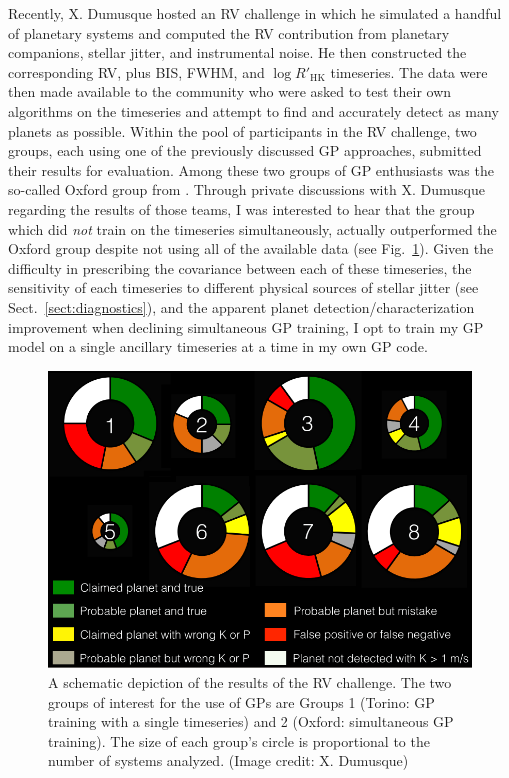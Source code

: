 Recently, X. Dumusque hosted an RV challenge \parencite[part I in][]{dumusque16} 
in which he simulated a handful of planetary systems and 
computed the RV contribution from planetary companions, stellar jitter, and instrumental 
noise. He then constructed the corresponding 
RV, plus BIS, FWHM, and $\log{R'_{\mathrm{HK}}}$ timeseries. The data were then made 
available to the community who were asked 
to test their own algorithms on the timeseries and attempt to find and accurately 
detect as many planets as possible. 
Within the pool of participants in the RV challenge, two groups, each using one of the 
previously discussed GP approaches, submitted their results for evaluation. Among these 
two groups of GP enthusiasts was the so-called Oxford group from \cite{rajpaul15}. 
Through 
private discussions with X. Dumusque regarding the results of those teams, I was 
interested 
to hear that the group which did \emph{not} train on the timeseries 
simultaneously, actually outperformed the Oxford group despite not using all of the 
available data (see Fig.~\ref{fig:rvchallenge}). Given the difficulty in 
prescribing the covariance between each of these timeseries, the sensitivity of 
each timeseries to different physical sources of stellar jitter (see 
Sect.~\ref{sect:diagnostics}), and the apparent planet detection/characterization 
improvement 
when declining simultaneous GP training, I opt to train my GP model on a single 
ancillary timeseries at a time in my own GP code. \\

\begin{figure}
\centering
\includegraphics[scale=.4]{figures/rvchallenge.png}
\caption{A schematic depiction of the results of the RV challenge. The two groups 
of interest for the use of GPs are Groups 1 (Torino: GP training with a single 
timeseries) and 2 (Oxford: simultaneous GP training). The size of each 
group's circle is proportional to the number of systems analyzed. (Image credit: 
X. Dumusque) \label{fig:rvchallenge}}
\end{figure}

